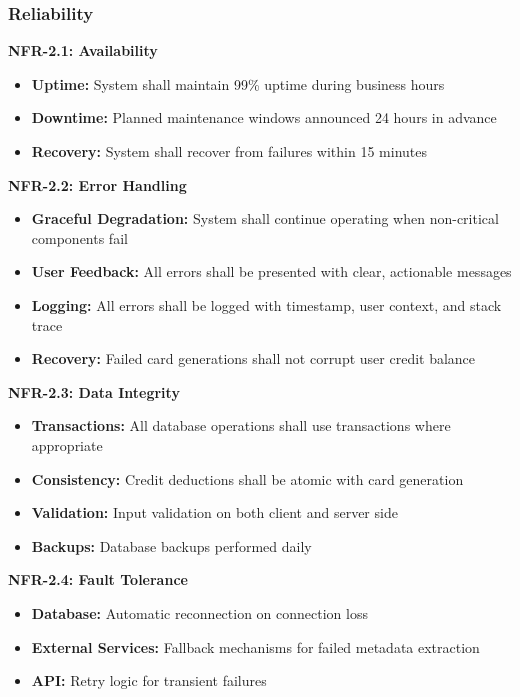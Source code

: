 \documentclass[12pt,a4paper]{article}
\begin{document}
\subsubsection{Reliability}

\textbf{NFR-2.1: Availability}
\begin{itemize}
    \item \textbf{Uptime:} System shall maintain 99\% uptime during business hours
    \item \textbf{Downtime:} Planned maintenance windows announced 24 hours in advance
    \item \textbf{Recovery:} System shall recover from failures within 15 minutes
\end{itemize}

\textbf{NFR-2.2: Error Handling}
\begin{itemize}
    \item \textbf{Graceful Degradation:} System shall continue operating when non-critical components fail
    \item \textbf{User Feedback:} All errors shall be presented with clear, actionable messages
    \item \textbf{Logging:} All errors shall be logged with timestamp, user context, and stack trace
    \item \textbf{Recovery:} Failed card generations shall not corrupt user credit balance
\end{itemize}

\textbf{NFR-2.3: Data Integrity}
\begin{itemize}
    \item \textbf{Transactions:} All database operations shall use transactions where appropriate
    \item \textbf{Consistency:} Credit deductions shall be atomic with card generation
    \item \textbf{Validation:} Input validation on both client and server side
    \item \textbf{Backups:} Database backups performed daily
\end{itemize}

\textbf{NFR-2.4: Fault Tolerance}
\begin{itemize}
    \item \textbf{Database:} Automatic reconnection on connection loss
    \item \textbf{External Services:} Fallback mechanisms for failed metadata extraction
    \item \textbf{API:} Retry logic for transient failures
\end{itemize}
\end{document}

